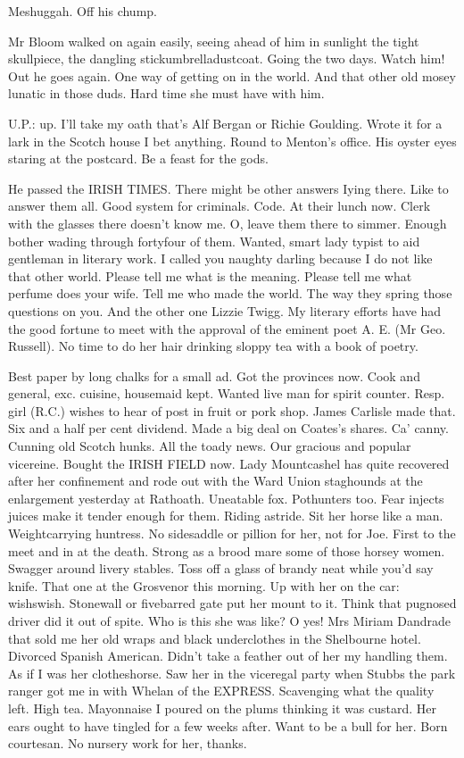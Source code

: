 Meshuggah. Off his chump.

Mr Bloom walked on again easily, seeing ahead of him in sunlight the
tight skullpiece, the dangling stickumbrelladustcoat. Going the two days.
Watch him!  Out he goes again. One way of getting on in the world. And
that other old mosey lunatic in those duds. Hard time she must have with
him.

U.P.: up. I'll take my oath that's Alf Bergan or Richie Goulding.
Wrote it for a lark in the Scotch house I bet anything. Round to Menton's
office. His oyster eyes staring at the postcard. Be a feast for the gods.

He passed the IRISH TIMES. There might be other answers Iying there.
Like to answer them all. Good system for criminals. Code. At their lunch
now. Clerk with the glasses there doesn't know me. O, leave them there to
simmer. Enough bother wading through fortyfour of them. Wanted, smart
lady typist to aid gentleman in literary work. I called you naughty
darling because I do not like that other world. Please tell me what is the
meaning. Please tell me what perfume does your wife. Tell me who made the
world. The way they spring those questions on you. And the other one
Lizzie Twigg. My literary efforts have had the good fortune to meet with
the approval of the eminent poet A. E. (Mr Geo. Russell). No time to do
her hair drinking sloppy tea with a book of poetry.

Best paper by long chalks for a small ad. Got the provinces now.
Cook and general, exc. cuisine, housemaid kept. Wanted live man for spirit
counter. Resp. girl (R.C.) wishes to hear of post in fruit or pork shop.
James Carlisle made that. Six and a half per cent dividend. Made a big
deal on Coates's shares. Ca' canny. Cunning old Scotch hunks. All the
toady news. Our gracious and popular vicereine. Bought the IRISH FIELD
now. Lady Mountcashel has quite recovered after her confinement and rode
out with the Ward Union staghounds at the enlargement yesterday at
Rathoath. Uneatable fox. Pothunters too. Fear injects juices make it
tender enough for them. Riding astride. Sit her horse like a man.
Weightcarrying huntress. No sidesaddle or pillion for her, not for Joe.
First to the meet and in at the death. Strong as a brood mare some of
those horsey women. Swagger around livery stables. Toss off a glass of
brandy neat while you'd say knife. That one at the Grosvenor this morning.
Up with her on the car: wishswish. Stonewall or fivebarred gate
put her mount to it. Think that pugnosed driver did it out of spite.
Who is this she was like? O yes! Mrs Miriam Dandrade that sold me
her old wraps and black underclothes in the Shelbourne hotel.
Divorced Spanish American. Didn't take a feather out of her
my handling them. As if I was her clotheshorse. Saw her in the
viceregal party when Stubbs the park ranger got me in with Whelan of the
EXPRESS. Scavenging what the quality left. High tea. Mayonnaise I poured
on the plums thinking it was custard. Her ears ought to have tingled for a
few weeks after. Want to be a bull for her. Born courtesan. No nursery
work for her, thanks.

